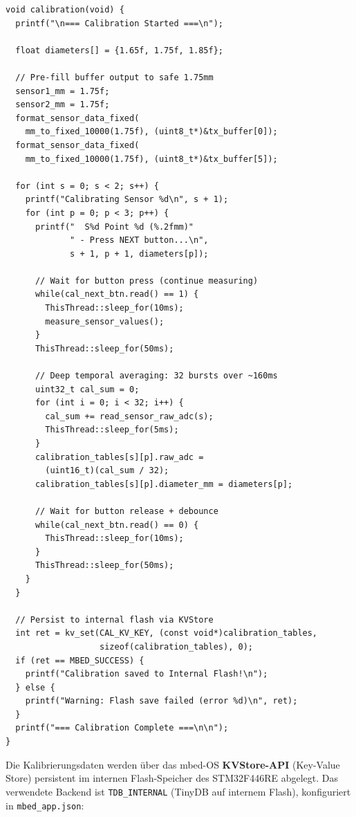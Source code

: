 \begin{lstlisting}[style=firmwarestyle, caption={Kalibrierprozedur mit tiefer zeitlicher Mittelung und Flash-Persistierung (\texttt{calibration}, Z.~204--258).}, label={lst:sensor_calibration}]
void calibration(void) {
  printf("\n=== Calibration Started ===\n");

  float diameters[] = {1.65f, 1.75f, 1.85f};

  // Pre-fill buffer output to safe 1.75mm
  sensor1_mm = 1.75f;
  sensor2_mm = 1.75f;
  format_sensor_data_fixed(
    mm_to_fixed_10000(1.75f), (uint8_t*)&tx_buffer[0]);
  format_sensor_data_fixed(
    mm_to_fixed_10000(1.75f), (uint8_t*)&tx_buffer[5]);

  for (int s = 0; s < 2; s++) {
    printf("Calibrating Sensor %d\n", s + 1);
    for (int p = 0; p < 3; p++) {
      printf("  S%d Point %d (%.2fmm)"
             " - Press NEXT button...\n",
             s + 1, p + 1, diameters[p]);

      // Wait for button press (continue measuring)
      while(cal_next_btn.read() == 1) {
        ThisThread::sleep_for(10ms);
        measure_sensor_values();
      }
      ThisThread::sleep_for(50ms);

      // Deep temporal averaging: 32 bursts over ~160ms
      uint32_t cal_sum = 0;
      for (int i = 0; i < 32; i++) {
        cal_sum += read_sensor_raw_adc(s);
        ThisThread::sleep_for(5ms);
      }
      calibration_tables[s][p].raw_adc =
        (uint16_t)(cal_sum / 32);
      calibration_tables[s][p].diameter_mm = diameters[p];

      // Wait for button release + debounce
      while(cal_next_btn.read() == 0) {
        ThisThread::sleep_for(10ms);
      }
      ThisThread::sleep_for(50ms);
    }
  }

  // Persist to internal flash via KVStore
  int ret = kv_set(CAL_KV_KEY, (const void*)calibration_tables,
                   sizeof(calibration_tables), 0);
  if (ret == MBED_SUCCESS) {
    printf("Calibration saved to Internal Flash!\n");
  } else {
    printf("Warning: Flash save failed (error %d)\n", ret);
  }
  printf("=== Calibration Complete ===\n\n");
}
\end{lstlisting}

\label{sec:sensor_cal_persistence}

Die Kalibrierungsdaten werden über das mbed-OS \textbf{KVStore-API} (Key-Value Store) persistent im internen Flash-Speicher des STM32F446RE abgelegt.
Das verwendete Backend ist \texttt{TDB\_INTERNAL} (TinyDB auf internem Flash), konfiguriert in \texttt{mbed\_app.json}:

